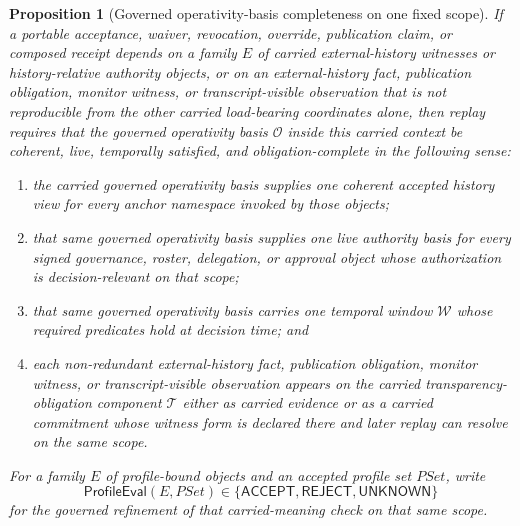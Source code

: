 \documentclass[11pt]{article}
\newtheorem{proposition}{Proposition}
\newcommand{\Acc}{\mathsf{ACCEPT}}
\newcommand{\Rej}{\mathsf{REJECT}}
\newcommand{\Unk}{\mathsf{UNKNOWN}}
\newcommand{\ProfileEval}{\mathsf{ProfileEval}}
\newcommand{\Window}{\mathcal{W}}
\begin{document}
\begin{proposition}[Governed operativity-basis completeness on one fixed scope]
If a portable acceptance, waiver, revocation, override, publication claim, or composed receipt depends on a family $E$ of carried external-history witnesses or history-relative authority objects,
or on an external-history fact, publication obligation, monitor witness, or transcript-visible observation that is not reproducible from the other carried load-bearing coordinates alone,
then replay requires that the governed operativity basis $\mathcal{O}$ inside this carried context be coherent, live, temporally satisfied, and obligation-complete in the following sense:
\begin{enumerate}[leftmargin=*]
  \item the carried governed operativity basis supplies one coherent accepted history view for every anchor namespace invoked by those objects;
  \item that same governed operativity basis supplies one live authority basis for every signed governance, roster, delegation, or approval object whose authorization is decision-relevant on that scope;
  \item that same governed operativity basis carries one temporal window $\Window$ whose required predicates hold at decision time; and
  \item each non-redundant external-history fact, publication obligation, monitor witness, or transcript-visible observation appears on the carried transparency-obligation component $\mathcal{T}$ either as carried evidence or as a carried commitment whose witness form is declared there and later replay can resolve on the same scope.
\end{enumerate}
For a family $E$ of profile-bound objects and an accepted profile set $PSet$, write
\[
\ProfileEval(E,PSet)\in\{\Acc,\Rej,\Unk\}
\]
for the governed refinement of that carried-meaning check on that same scope.
\end{proposition}
\end{document}
